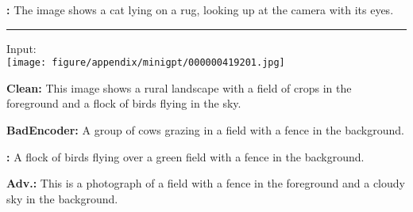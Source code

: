\begin{figure*}[t]
\begin{minipage}{0.39\linewidth}
\begin{tcolorbox}[colback=red!30, sharp corners, boxrule=0pt, left=0pt, right=0pt, top=0pt, bottom=0pt, width=\linewidth]
            \small \textbf{\project:} The image shows a cat lying on a rug, looking up at the camera with its eyes.
        \end{tcolorbox}
    \end{minipage}
    \newline
    \rule{\textwidth}{0.5pt}
    \begin{minipage}{0.2\linewidth}
        \begin{minipage}{\linewidth}
        \parbox{\linewidth}{\centering \small Input: \\ \texttt{[image: figure/appendix/minigpt/000000419201.jpg]}}
        \end{minipage}
    \end{minipage}
    \begin{minipage}{0.39\linewidth}
        \begin{tcolorbox}[colback=green!30, sharp corners, boxrule=0pt, left=0pt, right=0pt, top=0pt, bottom=0pt, width=\linewidth]
            \small \textbf{Clean:} This image shows a rural landscape with a field of crops in the foreground and a flock of birds flying in the sky.
        \end{tcolorbox}
        \vspace{-9px}
        \begin{tcolorbox}[colback=green!30, sharp corners, boxrule=0pt, left=0pt, right=0pt, top=0pt, bottom=0pt, width=\linewidth]
            \small \textbf{BadEncoder:} A group of cows grazing in a field with a fence in the background.
        \end{tcolorbox}
        \vspace{-9px}
        \begin{tcolorbox}[colback=green!30, sharp corners, boxrule=0pt, left=0pt, right=0pt, top=0pt, bottom=0pt, width=\linewidth]
            \small \textbf{\project:} A flock of birds flying over a green field with a fence in the background.
        \end{tcolorbox}
    \end{minipage}
    \begin{minipage}{0.39\linewidth}
        \begin{tcolorbox}[colback=green!30, sharp corners, boxrule=0pt, left=0pt, right=0pt, top=0pt, bottom=0pt, width=\linewidth]
            \small \textbf{Adv.:} This is a photograph of a field with a fence in the foreground and a cloudy sky in the background.
        \end{tcolorbox}

\end{minipage}
\end{figure*}
